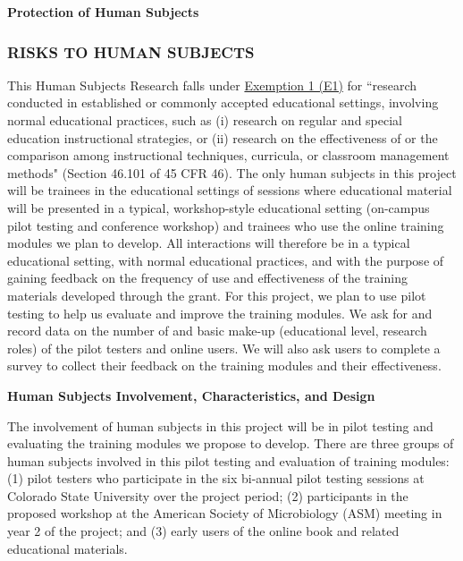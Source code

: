\documentclass[pdftex,english,11.5pt,parskip=half]{scrartcl}
\begin{document}
\def\bf{\normalfont\bfseries}
\pagestyle{empty}

{\large \textbf{Protection of Human Subjects}}

\subsubsection*{RISKS TO HUMAN SUBJECTS}

This Human Subjects Research falls under \underline{Exemption 1 (E1)} for ``research conducted in established or commonly accepted educational settings, involving normal educational practices, such as (i) research on regular and special education instructional strategies, or (ii) research on the effectiveness of or the comparison among instructional techniques, curricula, or classroom management methods" (Section 46.101 of 45 CFR 46). The only human subjects in this project will be trainees in the educational settings of sessions where educational material will be presented in a typical, workshop-style educational setting (on-campus pilot testing and conference workshop) and trainees who use the online training modules we plan to develop. All interactions will therefore be in a typical educational setting, with normal educational practices, and with the purpose of gaining feedback on the frequency of use and effectiveness of the training materials developed through the grant. For this project, we plan to use pilot testing to help us evaluate and improve the training modules. We ask for and record data on the number of and basic make-up (educational level, research roles) of the pilot testers and online users. We will also ask users to complete a survey to collect their feedback on the training modules and their effectiveness. 

\textbf{Human Subjects Involvement, Characteristics, and Design}

The involvement of human subjects in this project will be in pilot testing and 
evaluating the training modules we propose to develop. There are three groups of
human subjects involved in this pilot testing and evaluation of training modules: 
(1) pilot testers who participate in the six bi-annual pilot testing sessions at 
Colorado State University over the project period; (2) participants in the proposed
workshop at the American Society of Microbiology (ASM) meeting in year 2 of the project; 
and (3) early users of the online book and related educational materials. 
\end{document}
